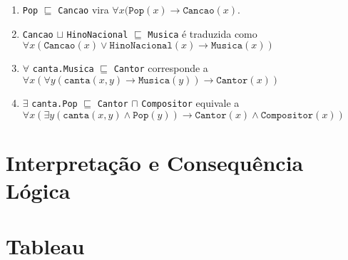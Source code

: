 \begin{enumerate}
	\item \texttt{Pop} $ \sqsubseteq $ \texttt{Cancao} vira $\forall x(\texttt{Pop}(x) \to \texttt{Cancao}(x)$.
	\item \texttt{Cancao} $ \sqcup $ \texttt{HinoNacional} $ \sqsubseteq $ \texttt{Musica} é traduzida como $\forall x(\texttt{Cancao}(x) \lor \texttt{HinoNacional}(x) \to \texttt{Musica}(x))$
	\item $ \forall $ \texttt{canta.Musica} $ \sqsubseteq $ \texttt{Cantor} corresponde a $ \forall x(\forall y(\texttt{canta}(x,y) \to \texttt{Musica}(y)) \to \texttt{Cantor}(x)) $
	\item $ \exists $ \texttt{canta.Pop} $ \sqsubseteq $ \texttt{Cantor} $ \sqcap $ \texttt{Compositor} equivale a $ \forall x (\exists y(\texttt{canta}(x,y) \land \texttt{Pop}(y)) \to \texttt{Cantor}(x) \land \texttt{Compositor}(x))$
\end{enumerate}

\section{Interpretação e Consequência Lógica}



\section{Tableau}